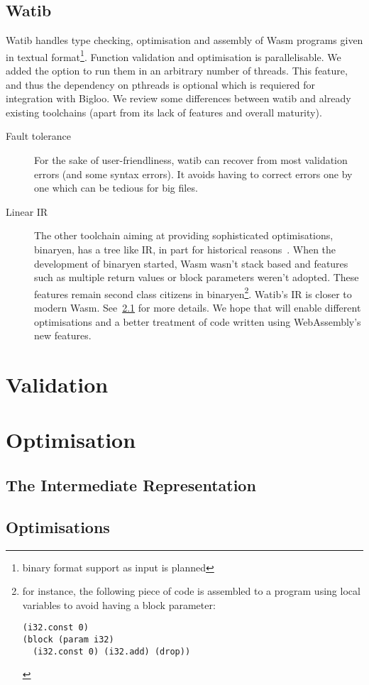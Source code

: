 \documentclass[10pt]{article}
\begin{document}
\subsection{Watib}
Watib handles type checking, optimisation and assembly of Wasm programs given in
textual format\footnote{binary format support as input is planned}. Function
validation and optimisation is parallelisable. We added the option to run them
in an arbitrary number of threads. This feature, and thus the dependency on
pthreads is optional which is requiered for integration with Bigloo. We review
some differences between watib and already existing toolchains (apart from its
lack of features and overall maturity).
\begin{description}
\item[Fault tolerance] For the sake of user-friendliness, watib can recover from
  most validation errors (and some syntax errors). It avoids having to correct
  errors one by one which can be tedious for big files.
\item[Linear IR] The other toolchain aiming at providing sophisticated
  optimisations, binaryen, has a tree like IR, in part for historical
  reasons~\cite{BinaryenIR}. When the development of binaryen started, Wasm
  wasn't stack based and features such as multiple return values or block
  parameters weren't adopted. These features remain second class citizens in
  binaryen\footnote{for instance, the following piece of code is assembled to a
  program using local variables to avoid having a block parameter:
\begin{verbatim}(i32.const 0)
(block (param i32)
  (i32.const 0) (i32.add) (drop))
\end{verbatim}
}. Watib's IR is closer to modern Wasm. See~\ref{ir} for more details. We hope
  that will enable different optimisations and a better treatment of code
  written using WebAssembly's new features.
\end{description}
\section{Validation}
\section{Optimisation}
\subsection{The Intermediate Representation}\label{ir}
\subsection{Optimisations}
\printbibliography
\end{document}
